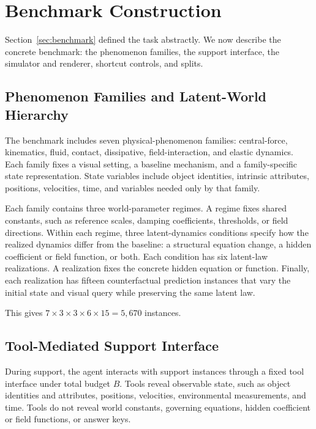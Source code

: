\section{Benchmark Construction}
\label{sec:construction}

Section~\ref{sec:benchmark} defined the task abstractly. We now describe the concrete benchmark: the phenomenon families, the support interface, the simulator and renderer, shortcut controls, and splits.

\subsection{Phenomenon Families and Latent-World Hierarchy}

The benchmark includes seven physical-phenomenon families: central-force, kinematics, fluid, contact, dissipative, field-interaction, and elastic dynamics. Each family fixes a visual setting, a baseline mechanism, and a family-specific state representation. State variables include object identities, intrinsic attributes, positions, velocities, time, and variables needed only by that family.

Each family contains three world-parameter regimes. A regime fixes shared constants, such as reference scales, damping coefficients, thresholds, or field directions. Within each regime, three latent-dynamics conditions specify how the realized dynamics differ from the baseline: a structural equation change, a hidden coefficient or field function, or both. Each condition has six latent-law realizations. A realization fixes the concrete hidden equation or function. Finally, each realization has fifteen counterfactual prediction instances that vary the initial state and visual query while preserving the same latent law.

This gives $7 \times 3 \times 3 \times 6 \times 15 = 5{,}670$ instances. 

\subsection{Tool-Mediated Support Interface}
\label{sec:construction:tools}

During support, the agent interacts with support instances through a fixed tool interface under total budget $B$. Tools reveal observable state, such as object identities and attributes, positions, velocities, environmental measurements, and time. Tools do not reveal world constants, governing equations, hidden coefficient or field functions, or answer keys.

